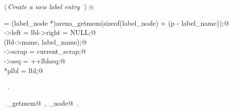 \documentclass{report}
\begin{document}
\begin{flushleft} \small
\begin{minipage}{\linewidth} \label{scrap248}
$\langle\,${\it Create a new label entry}\nobreak\ {\footnotesize {}}$\,\rangle\equiv$
\vspace{-1ex}
\begin{list}{}{} \item
\mbox{}\verb@lbl = (label_node *)arena_getmem(sizeof(label_node) + (p - label_name));@\\
\mbox{}\verb@lbl->left = lbl->right = NULL;@\\
\mbox{}\verb@strcpy(lbl->name, label_name);@\\
\mbox{}\verb@lbl->scrap = current_scrap;@\\
\mbox{}\verb@lbl->seq = ++lblseq;@\\
\mbox{}\verb@*plbl = lbl;@{\NWsep}
\end{list}
\vspace{-1ex}
\footnotesize\addtolength{\baselineskip}{-1ex}
\begin{list}{}{\setlength{\itemsep}{-\parsep}\setlength{\itemindent}{-\leftmargin}}
\item \NWtxtMacroRefIn\ .
\end{list}
\vspace{-2ex}
\footnotesize\addtolength{\baselineskip}{-1ex}
\begin{list}{}{\setlength{\itemsep}{-\parsep}\setlength{\itemindent}{-\leftmargin}}
\item \NWtxtIdentsUsed\nobreak\  \verb@arena_getmem@\nobreak\ , \verb@label_node@\nobreak\ .\end{list}
\end{minipage}\\[4ex]
\end{flushleft}
\end{document}
